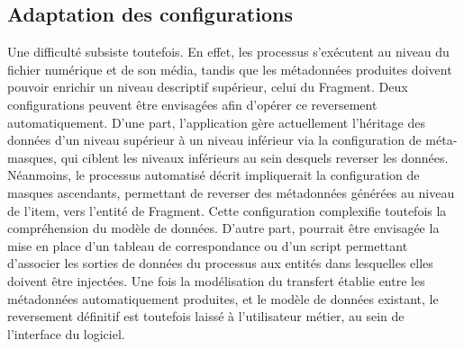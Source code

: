 \subsection{Adaptation des configurations}
Une difficulté subsiste toutefois. En effet, les processus s'exécutent au niveau du fichier numérique et de son média, tandis que les métadonnées produites doivent pouvoir enrichir un niveau descriptif supérieur, celui du Fragment. Deux configurations peuvent être envisagées afin d'opérer ce reversement automatiquement. D'une part, l'application gère actuellement l'héritage des données d'un niveau supérieur à un niveau inférieur via la configuration de méta-masques, qui ciblent les niveaux inférieurs au sein desquels reverser les données. Néanmoins, le processus automatisé décrit impliquerait la configuration de masques ascendants, permettant de reverser des métadonnées générées au niveau de l'\gls{item}, vers l'entité de Fragment. Cette configuration complexifie toutefois la compréhension du modèle de données.
D'autre part, pourrait être envisagée la mise en place d'un tableau de correspondance ou d'un script permettant d'associer les sorties de données du processus aux entités dans lesquelles elles doivent être injectées. 
Une fois la modélisation du transfert établie entre les métadonnées automatiquement produites, et le modèle de données existant, le reversement définitif est toutefois laissé à l'utilisateur métier, au sein de l'interface du logiciel. 
